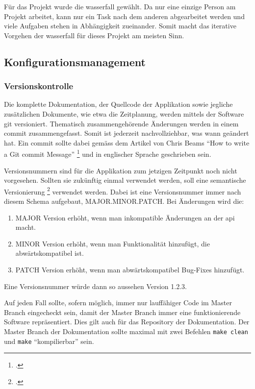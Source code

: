 Für das Projekt wurde die \gls{wasserfall} gewählt. Da nur eine
einzige Person am Projekt arbeitet, kann nur ein Task nach dem anderen
abgearbeitet werden und viele Aufgaben stehen in Abhängigkeit zueinander.
Somit macht das iterative Vorgehen der \gls{wasserfall} für dieses Projekt am
meisten Sinn.

\subsection{Konfigurationsmanagement}
\label{sec:org54092b2}

\subsubsection{Versionskontrolle}
\label{sec:org7cdfd56}

Die komplette Dokumentation, der Quellcode der Applikation sowie jegliche
zusätzlichen Dokumente, wie etwa die Zeitplanung, werden mittels der Software
\gls{git} versioniert. Thematisch zusammengehörende Änderungen werden in einem
\gls{commit} zusammengefasst. Somit ist jederzeit nachvollziehbar, was wann
geändert hat. Ein \gls{commit} sollte dabei gemäss dem Artikel von Chris Beams
"`How to write a Git \gls{commit} Message"' \footcite{commit} und in englischer
Sprache geschrieben sein.

Versionsnummern sind für die Applikation zum jetzigen Zeitpunkt noch nicht
vorgesehen. Sollten sie zukünftig einmal verwendet werden, soll eine
semantische Versionierung \footcite{semver} verwendet werden. Dabei ist eine
Versionsnummer immer nach diesem Schema aufgebaut, MAJOR.MINOR.PATCH. Bei
Änderungen wird die:
\begin{enumerate}
\item MAJOR Version erhöht, wenn man inkompatible Änderungen an der \gls{api} macht.
\item MINOR Version erhöht, wenn man Funktionalität hinzufügt, die
abwärtskompatibel ist.
\item PATCH Version erhöht, wenn man abwärtskompatibel Bug-Fixes hinzufügt.
\end{enumerate}
Eine Versionsnummer würde dann so aussehen Version 1.2.3.

Auf jeden Fall sollte, sofern möglich, immer nur lauffähiger Code im Master
Branch eingecheckt sein, damit der Master Branch immer eine funktionierende
Software repräsentiert. Dies gilt auch für das Repository der Dokumentation.
Der Master Branch der Dokumentation sollte maximal mit zwei Befehlen \texttt{make
clean} und \texttt{make} "`kompilierbar"' sein.

